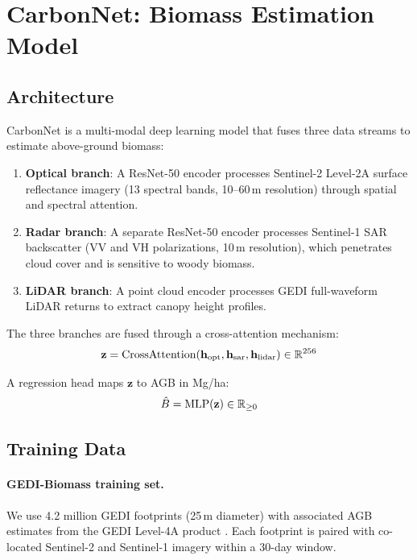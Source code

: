 \section{CarbonNet: Biomass Estimation Model}

\label{sec:carbonnet}

\subsection{Architecture}

CarbonNet is a multi-modal deep learning model that fuses three data
streams to estimate above-ground biomass:

\begin{enumerate}
  \item \textbf{Optical branch}: A ResNet-50 encoder processes
    Sentinel-2 Level-2A surface reflectance imagery (13 spectral bands,
    10--60\,m resolution) through spatial and spectral attention.
  \item \textbf{Radar branch}: A separate ResNet-50 encoder processes
    Sentinel-1 SAR backscatter (VV and VH polarizations, 10\,m
    resolution), which penetrates cloud cover and is sensitive to
    woody biomass.
  \item \textbf{LiDAR branch}: A point cloud encoder processes GEDI
    full-waveform LiDAR returns to extract canopy height profiles.
\end{enumerate}

The three branches are fused through a cross-attention mechanism:
\begin{equation}
  \mathbf{z} = \text{CrossAttention}(\mathbf{h}_{\text{opt}},
  \mathbf{h}_{\text{sar}}, \mathbf{h}_{\text{lidar}}) \in \mathbb{R}^{256}
\end{equation}

A regression head maps $\mathbf{z}$ to AGB in Mg/ha:
\begin{equation}
  \hat{B} = \text{MLP}(\mathbf{z}) \in \mathbb{R}_{\geq 0}
\end{equation}

\subsection{Training Data}

\paragraph{GEDI-Biomass training set.} We use 4.2 million GEDI
footprints (25\,m diameter) with associated AGB estimates from the GEDI
Level-4A product \citep{dubayah2022gedi}. Each footprint is paired with
co-located Sentinel-2 and Sentinel-1 imagery within a 30-day window.

